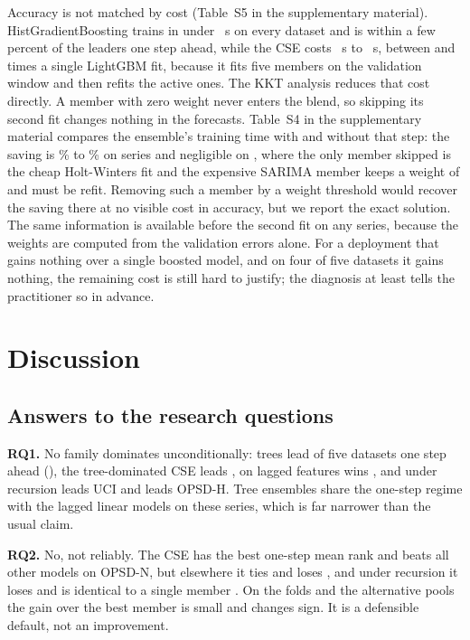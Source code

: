 \documentclass[journal]{IEEEtran}
\newif\iffullversion
\begin{document}
Accuracy is not matched by cost (\iffullversion Table~\ref{tab:cost}\else Table~S5 in the supplementary material\fi). HistGradientBoosting trains in under \hgbTimeMax~s on every dataset and is within a few percent of the leaders one step ahead, while the CSE costs \cseTimeMin~s to \cseTimeMax~s, between \costRatioLgbMin{} and \costRatioLgbMax{} times a single LightGBM fit, because it fits five members on the validation window and then refits the active ones. The KKT analysis reduces that cost directly. A member with zero weight never enters the blend, so skipping its second fit changes nothing in the forecasts. \iffullversion Table~\ref{tab:refit}\else Table~S4 in the supplementary material\fi{} compares the ensemble's training time with and without that step: the saving is \% to \% on \nRefitSaved{} series and negligible on , where the only member skipped is the cheap Holt-Winters fit and the expensive SARIMA member keeps a weight of \wSarimaOPSDNsci{} and must be refit. Removing such a member by a weight threshold would recover the saving there at no visible cost in accuracy, but we report the exact solution. The same information is available before the second fit on any series, because the weights are computed from the validation errors alone. For a deployment that gains nothing over a single boosted model, and on four of five datasets it gains nothing, the remaining cost is still hard to justify; the diagnosis at least tells the practitioner so in advance.

\section{Discussion}
\subsection{Answers to the research questions}
\label{sec:answers}
\textbf{RQ1.} No family dominates unconditionally: trees lead \nTreeWinsOne{} of five datasets one step ahead (\treeWinsOneList), the tree-dominated CSE leads \winListOne, \linearWinsOneModel{} on lagged features wins \linearWinsOneList, and under recursion \bestRecUCI{} leads UCI and \bestRecOPSDDEhousehold{} leads OPSD-H. Tree ensembles share the one-step regime with the lagged linear models on these series, which is far narrower than the usual claim.

\textbf{RQ2.} No, not reliably. The CSE has the best one-step mean rank and beats all \nBeatsOPSDDEtotalOne{} other models on OPSD-N, but elsewhere it ties \tiesTimesOne{} and loses \lossTimesOne, and under recursion it loses \lossTimesRec{} and is identical to a single member \identTimesRec. On the folds and the alternative pools the gain over the best member is small and changes sign. It is a defensible default, not an improvement.
\end{document}
